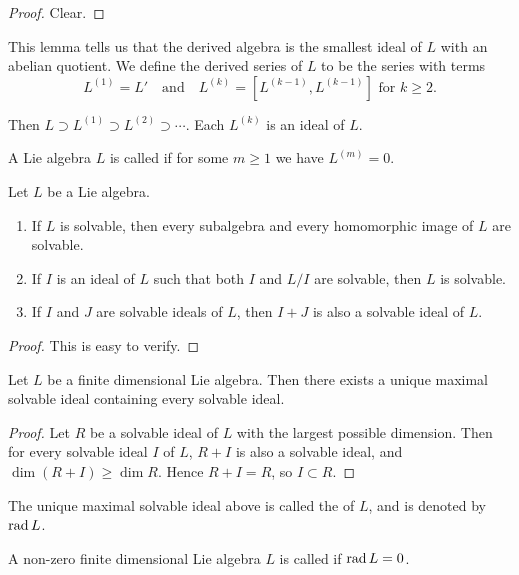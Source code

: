 \begin{proof}
    Clear.
\end{proof}

This lemma tells us that the derived algebra is the smallest ideal of $L$ with an abelian quotient. We define the derived series of $L$ to be the series with terms
\[
    L^{(1)}=L' \quad \mbox{and} \quad L^{(k)}=[L^{(k-1)},L^{(k-1)}] \mbox{ for } k\geq 2.
\]

Then $L\supset L^{(1)}\supset L^{(2)}\supset\cdots$. Each $L^{(k)}$ is an ideal of $L$.

\begin{defn}
    A Lie algebra $L$ is called  if for some $m\geq 1$ we have $L^{(m)}=0$.
\end{defn}

\begin{lem}
    Let $L$ be a Lie algebra.
    \begin{enumerate}
        \item If $L$ is solvable, then every subalgebra and every homomorphic image of $L$ are solvable.
        \item If $I$ is an ideal of $L$ such that both $I$ and $L/I$ are solvable, then $L$ is solvable.
        \item If $I$ and $J$ are solvable ideals of $L$, then $I+J$ is also a solvable ideal of $L$.
    \end{enumerate}
\end{lem}

\begin{proof}
    This is easy to verify.
\end{proof}

\begin{cor}
    Let $L$ be a finite dimensional Lie algebra. Then there exists a unique maximal solvable ideal containing every solvable ideal.
\end{cor}

\begin{proof}
    Let $R$ be a solvable ideal of $L$ with the largest possible dimension. Then for every solvable ideal $I$ of $L$, $R+I$ is also a solvable ideal, and $\dim (R+I)\geq\dim R$. Hence $R+I=R$, so $I\subset R$.
\end{proof}

The unique maximal solvable ideal above is called the  of $L$, and is denoted by $\operatorname{rad} L$.

\begin{defn}
    A non-zero finite dimensional Lie algebra $L$ is called  if $\operatorname{rad} L=0$.
\end{defn}

